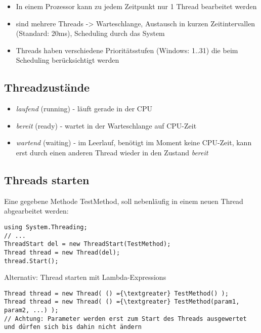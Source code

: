 \begin{itemize}
\item In einem Prozessor kann zu jedem Zeitpunkt nur 1 Thread bearbeitet werden
\item sind mehrere Threads -{\textgreater} Warteschlange, Austausch in kurzen Zeitintervallen (Standard: 20ms), Scheduling durch das System
\item Threads haben verschiedene Prioritätsstufen (Windows: 1..31) die beim Scheduling berücksichtigt werden
\end{itemize}

\subsection{Threadzustände}

\begin{itemize}
\item \emph{laufend} (running) - läuft gerade in der CPU
\item \emph{bereit} (ready) - wartet in der Warteschlange auf CPU-Zeit
\item \emph{wartend} (waiting) - im Leerlauf, benötigt im Moment keine CPU-Zeit, kann erst durch einen anderen Thread wieder in den Zustand \emph{bereit}
\end{itemize}

\subsection{Threads starten}

Eine gegebene Methode TestMethod, soll nebenläufig in einem neuen Thread abgearbeitet werden:

\begin{lstlisting}[language={[Sharp]C}]
using System.Threading;
// ...
ThreadStart del = new ThreadStart(TestMethod);
Thread thread = new Thread(del);
thread.Start();
\end{lstlisting}

Alternativ: Thread starten mit Lambda-Expressions

\begin{lstlisting}[language={[Sharp]C}]
Thread thread = new Thread( () ={\textgreater} TestMethod() );
Thread thread = new Thread( () ={\textgreater} TestMethod(param1, param2, ...) );
// Achtung: Parameter werden erst zum Start des Threads ausgewertet und dürfen sich bis dahin nicht ändern 
\end{lstlisting}

